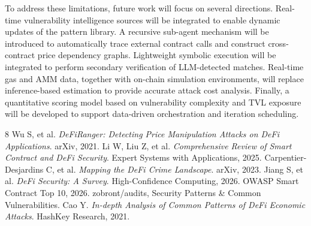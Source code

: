 \documentclass[10pt]{article}
\begin{document}
To address these limitations, future work will focus on several directions. Real-time vulnerability intelligence sources will be integrated to enable dynamic updates of the pattern library. A recursive sub-agent mechanism will be introduced to automatically trace external contract calls and construct cross-contract price dependency graphs. Lightweight symbolic execution will be integrated to perform secondary verification of LLM-detected matches. Real-time gas and AMM data, together with on-chain simulation environments, will replace inference-based estimation to provide accurate attack cost analysis. Finally, a quantitative scoring model based on vulnerability complexity and TVL exposure will be developed to support data-driven orchestration and iteration scheduling.

\begin{thebibliography}{8}
\setlength{\itemsep}{0pt}
 Wu S, et al. \textit{DeFiRanger: Detecting Price Manipulation Attacks on DeFi Applications}. arXiv, 2021.
 Li W, Liu Z, et al. \textit{Comprehensive Review of Smart Contract and DeFi Security}. Expert Systems with Applications, 2025.
 Carpentier-Desjardins C, et al. \textit{Mapping the DeFi Crime Landscape}. arXiv, 2023.
 Jiang S, et al. \textit{DeFi Security: A Survey}. High-Confidence Computing, 2026.
 OWASP Smart Contract Top 10, 2026.
 zobront/audits, Security Patterns \& Common Vulnerabilities.
 Cao Y. \textit{In-depth Analysis of Common Patterns of DeFi Economic Attacks}. HashKey Research, 2021.
\end{thebibliography}
\end{document}
